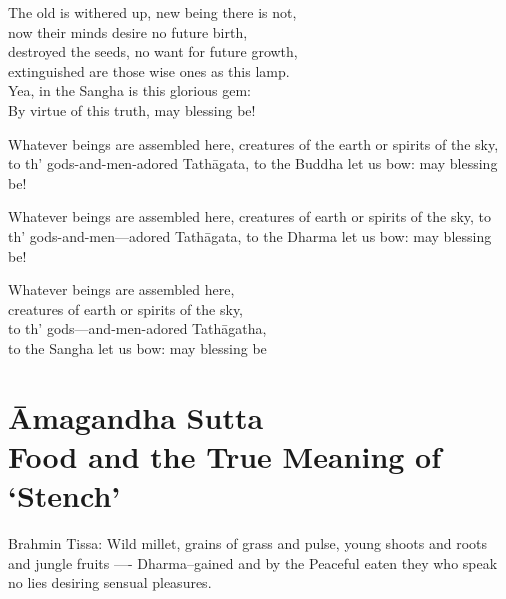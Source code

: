 \begin{MyDescription}{}
The old is withered up, new being there is not,\\
now their minds desire no future birth,\\
destroyed the seeds, no want for future growth,\\
extinguished are those wise ones as this lamp.\\
Yea, in the Sangha is this glorious gem:\\
By virtue of this truth, may blessing be!
\end{MyDescription}

\begin{MyDescription}{}
Whatever beings are assembled here,
creatures of the earth or spirits of the sky,
to th' gods-and-men-adored Tath\=agata,
to the Buddha let us bow: may blessing be!
\end{MyDescription}

\begin{MyDescription}{}
Whatever beings are assembled here,
creatures of earth or spirits of the sky,
to th' gods-and-men—adored Tath\=agata,
to the Dharma let us bow: may blessing be!
\end{MyDescription}

\begin{MyDescription}{}
Whatever beings are assembled here,\\
creatures of earth or spirits of the sky,\\
to th' gods—and-men-adored Tath\=agatha,\\
to the Sangha let us bow: may blessing be
\end{MyDescription}

\begin{MyDescription}[(Sn. 222-238)]{}
\end{MyDescription}

\chapter{\=Amagandha Sutta\\ Food and the True Meaning of `Stench'}

\begin{MyDescription}{Brahmin Tissa:}
Wild millet, grains of grass and pulse,
young shoots and roots and jungle fruits —-
Dharma--gained and by the Peaceful eaten
they who speak no lies desiring sensual pleasures.
\end{MyDescription}

